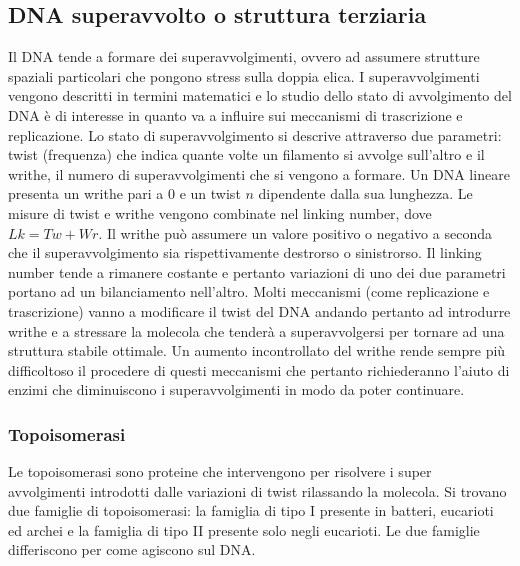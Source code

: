 	\subsection{DNA superavvolto o struttura terziaria}
	Il DNA tende a formare dei superavvolgimenti, ovvero ad assumere strutture spaziali particolari che pongono stress sulla doppia elica. 
	I superavvolgimenti vengono descritti in termini matematici e lo studio dello stato di avvolgimento del DNA \`e di interesse in quanto va a influire sui meccanismi di trascrizione e replicazione. 
	Lo stato di superavvolgimento si descrive attraverso due parametri: twist (frequenza) che indica quante volte un filamento si avvolge sull'altro e il writhe, il numero di superavvolgimenti che si vengono a formare. 
	Un DNA lineare presenta un writhe pari a $0$ e un twist $n$ dipendente dalla sua lunghezza. 
	Le misure di twist e writhe vengono combinate nel linking number, dove $Lk=Tw+Wr$. 
	Il writhe pu\`o assumere un valore positivo o negativo a seconda che il superavvolgimento sia rispettivamente destrorso o sinistrorso. 
	Il linking number tende a rimanere costante e pertanto variazioni di uno dei due parametri portano ad un bilanciamento nell'altro. 
	Molti meccanismi (come replicazione e trascrizione) vanno a modificare il twist del DNA andando pertanto ad introdurre writhe e a stressare la molecola che tender\`a a superavvolgersi per tornare ad una struttura stabile ottimale. 
	Un aumento incontrollato del writhe rende sempre pi\`u difficoltoso il procedere di questi meccanismi che pertanto richiederanno l'aiuto di enzimi che diminuiscono i superavvolgimenti in modo da poter continuare.

		\subsubsection{Topoisomerasi}
		Le topoisomerasi sono proteine che intervengono per risolvere i super avvolgimenti introdotti dalle variazioni di twist rilassando la molecola. 
		Si trovano due famiglie di topoisomerasi: la famiglia di tipo I presente in batteri, eucarioti ed archei e la famiglia di tipo II presente solo negli eucarioti. 
		Le due famiglie differiscono per come agiscono sul DNA.


